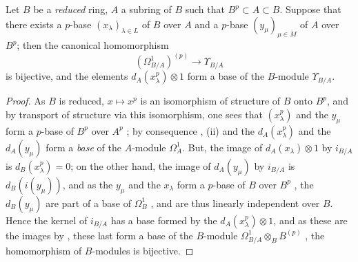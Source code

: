 \begin{proposition}[21.3.5]
\label{0.21.3.5}
Let $B$ be a \emph{reduced} ring, $A$ a subring of $B$ such that $B^p\subset A\subset B$.
Suppose that there exists a $p$-base $(x_\lambda)_{\lambda\in L}$ of $B$ over $A$ and a $p$-base $(y_\mu)_{\mu\in M}$ of $A$ over $B^p$; then the canonical homomorphism 
\begin{equation}
\tag{21.3.5.1}
  \label{0.21.3.5.1}
  (\Omega^1_{B/A})^{(p)}\to\Upsilon_{B/A}
\end{equation}
is bijective, and the elements $d_A(x^p_\lambda)\otimes 1$ form a base of the $B$-module $\Upsilon_{B/A}$.
\end{proposition}

\begin{proof}
As $B$ is reduced, $x\mapsto x^p$ is an isomorphism of structure of $B$ onto $B^p$, and by transport of structure via this isomorphism, one sees that $(x^p_\lambda)$ and the $y_\mu$ form a $p$-base of $B^p$ over $A^p$ ; by consequence , (ii) and  the $d_A(x^p_\lambda)$ and the $d_A(y_\mu)$ form a \emph{base} of the $A$-module $\Omega^1_A$.
But, the image of $d_A(x_\lambda)\otimes 1$ by $i_{B/A}$ is $d_B(x^p_\lambda)=0$; on the other hand, the image of $d_A(y_\mu)$ by $i_{B/A}$ is $d_B(i(y_\mu))$, and as the $y_\mu$ and the $x_\lambda$ form a $p$-base of $B$ over $B^p$ , the $d_B(y_\mu)$ are part of a base of $\Omega^1_B$ , and are thus linearly independent over $B$.
Hence the kernel of $i_{B/A}$ has a base formed by the $d_A(x^p_\lambda)\otimes 1$, and as these are the images by , these last form a base of the $B$-module $\Omega^1_{B/A}\otimes_B B^{(p)}$ , the homomorphism  of $B$-modules is bijective.
\end{proof}

